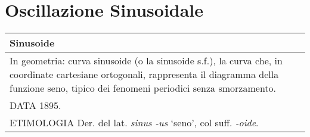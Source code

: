 \clearpage

\section{Oscillazione Sinusoidale}

		\begin{tabular}{L{.969\textwidth}}%
		\toprule
			\textbf{Sinusoide} \\
		\midrule
			In geometria: curva sinusoide (o la sinusoide s.f.), la curva che, in
			coordinate cartesiane ortogonali, rappresenta il diagramma della funzione
			seno, tipico dei fenomeni periodici senza smorzamento. \\

			DATA 1895.\\

			ETIMOLOGIA Der. del lat. \emph{sinus -us} ‘seno’, col suff. \emph{-oide}.\\
		\bottomrule
		\end{tabular}

